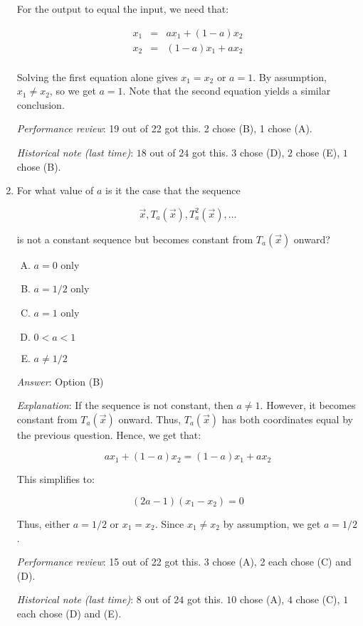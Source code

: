 \documentclass[10pt]{amsart}
\begin{document}
\begin{enumerate}
  For the output to equal the input, we need that:

  \begin{eqnarray*}
    x_1 & = & ax_1 + (1 - a)x_2\\
    x_2 & = & (1 - a)x_1 + ax_2 \\
  \end{eqnarray*}

  Solving the first equation alone gives $x_1 = x_2$ or $a = 1$. By
  assumption, $x_1 \ne x_2$, so we get $a = 1$. Note that the second
  equation yields a similar conclusion.

  {\em Performance review}: 19 out of 22 got this. 2 chose (B), 1 chose (A).

  {\em Historical note (last time)}: $18$ out of $24$ got this. $3$ chose (D),
  $2$ chose (E), $1$ chose (B).

\item For what value of $a$ is it the case that the sequence

  $$\vec{x}, T_a(\vec{x}), T_a^2(\vec{x}), \dots$$

  is not a constant sequence but becomes constant from $T_a(\vec{x})$
  onward?

  \begin{enumerate}[(A)]
  \item $a = 0$ only
  \item $a = 1/2$ only
  \item $a = 1$ only
  \item $0 < a < 1$ 
  \item $a \ne 1/2$
  \end{enumerate}

  {\em Answer}: Option (B)

  {\em Explanation}: If the sequence is not constant, then $a \ne
  1$. However, it becomes constant from $T_a(\vec{x})$ onward. Thus,
  $T_a(\vec{x})$ has both coordinates equal by the previous
  question. Hence, we get that:

  $$ax_1 + (1 - a)x_2 = (1 - a)x_1 + ax_2$$

  This simplifies to:

  $$(2a - 1)(x_1 - x_2) = 0$$

  Thus, either $a = 1/2$ or $x_1 = x_2$. Since $x_1 \ne x_2$ by
  assumption, we get $a = 1/2$.

  {\em Performance review}: 15 out of 22 got this. 3 chose (A), 2 each
  chose (C) and (D).

  {\em Historical note (last time)}: $8$ out of $24$ got this. $10$ chose (A),
  $4$ chose (C), $1$ each chose (D) and (E).


\end{enumerate}
\end{document}
